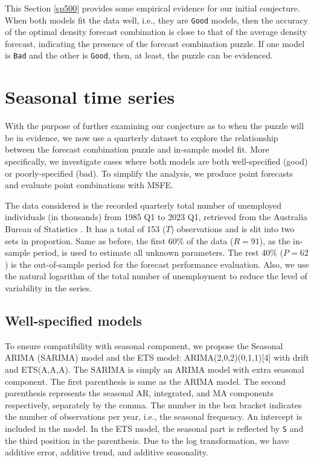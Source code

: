 \documentclass{monashthesis}
\begin{document}
This Section \ref{sp500} provides some empirical evidence for our initial conjecture. When both models fit the data well, i.e., they are \texttt{Good} models, then the accuracy of the optimal density forecast combination is close to that of the average density forecast, indicating the presence of the forecast combination puzzle. If one model is \texttt{Bad} and the other is \texttt{Good}, then, at least, the puzzle can be evidenced.

\hypertarget{seasonal-time-series}{%
\section{Seasonal time series}\label{seasonal-time-series}}

With the purpose of further examining our conjecture as to when the puzzle will be in evidence, we now use a quarterly dataset to explore the relationship between the forecast combination puzzle and in-sample model fit. More specifically, we investigate cases where both models are both well-specified (good) or poorly-specified (bad). To simplify the analysis, we produce point forecasts and evaluate point combinations with MSFE.

The data considered is the recorded quarterly total number of unemployed individuals (in thousands) from 1985 Q1 to 2023 Q1, retrieved from the Australia Bureau of Statistics \autocite{ABS}. It has a total of 153 (\(T\)) observations and is slit into two sets in proportion. Same as before, the first 60\% of the data (\(R = 91\)), as the in-sample period, is used to estimate all unknown parameters. The rest 40\% (\(P = 62\)) is the out-of-sample period for the forecast performance evaluation. Also, we use the natural logarithm of the total number of unemployment to reduce the level of variability in the series.

\hypertarget{well-specified-models}{%
\subsection{Well-specified models}\label{well-specified-models}}

To ensure compatibility with seasonal component, we propose the Seasonal ARIMA (SARIMA) model and the ETS model: ARIMA(2,0,2)(0,1,1){[}4{]} with drift and ETS(A,A,A). The SARIMA is simply an ARIMA model with extra seasonal component. The first parenthesis is same as the ARIMA model. The second parenthesis represents the seasonal AR, integrated, and MA components respectively, separately by the comma. The number in the box bracket indicates the number of observations per year, i.e., the seasonal frequency. An intercept is included in the model. In the ETS model, the seasonal part is reflected by \texttt{S} and the third position in the parenthesis. Due to the log transformation, we have additive error, additive trend, and additive seasonality.
\end{document}
